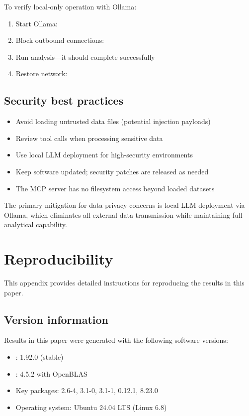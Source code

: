 To verify local-only operation with Ollama:

\begin{enumerate}
  \item Start Ollama: 
  \item Block outbound connections: 
  \item Run analysis---it should complete successfully
  \item Restore network: 
\end{enumerate}

\subsection{Security best practices}

\begin{itemize}
  \item Avoid loading untrusted data files (potential injection payloads)
  \item Review tool calls when processing sensitive data
  \item Use local LLM deployment for high-security environments
  \item Keep software updated; security patches are released as needed
  \item The MCP server has no filesystem access beyond loaded datasets
\end{itemize}

\noindent The primary mitigation for data privacy concerns is local
LLM deployment via Ollama, which eliminates all external data
transmission while maintaining full analytical capability.

\section{Reproducibility} \label{app:reproducibility}
\setcounter{table}{0}
\setcounter{figure}{0}

This appendix provides detailed instructions for reproducing the results in this paper.

\subsection{Version information}

Results in this paper were generated with the following software versions:
\begin{itemize}
  \item {}: 1.92.0 (stable)
  \item {}: 4.5.2 with OpenBLAS
  \item Key  packages:  2.6-4,  3.1-0,
     3.1-1,  0.12.1,  8.23.0
  \item Operating system: Ubuntu 24.04 LTS (Linux 6.8)
\end{itemize}

